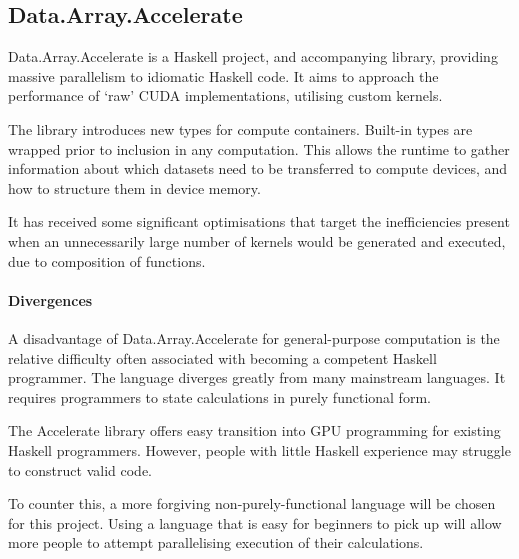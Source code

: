 \subsection{Data.Array.Accelerate}

Data.Array.Accelerate is a Haskell project\cite{daa}, and accompanying library\cite{daalib}, providing massive parallelism to idiomatic Haskell code. It aims to approach the performance of `raw' \ac{CUDA} implementations, utilising custom kernels.

The library introduces new types for compute containers. Built-in types are wrapped prior to inclusion in any computation. This allows the runtime to gather information about which datasets need to be transferred to compute devices, and how to structure them in device memory.

It has received some significant optimisations\cite{daaopt} that target the inefficiencies present when an unnecessarily large number of kernels would be generated and executed, due to composition of functions.

\paragraph*{Divergences}
A disadvantage of Data.Array.Accelerate for general-purpose computation is the relative difficulty often associated with becoming a competent Haskell programmer. The language diverges greatly from many mainstream languages.  It requires programmers to state calculations in purely functional form.

The Accelerate library offers easy transition into \ac{GPU} programming for existing Haskell programmers. However, people with little Haskell experience may struggle to construct valid code.

 To counter this, a more forgiving non-purely-functional language will be chosen for this project. Using a language that is easy for beginners to pick up will allow more people to attempt parallelising execution of their calculations.
